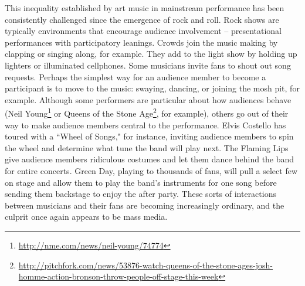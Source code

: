 This inequality established by art music in mainstream performance has been consistently challenged since the emergence of rock and roll. Rock shows are typically environments that encourage audience involvement -- presentational performances with participatory leanings. Crowds join the music making by clapping or singing along, for example. They add to the light show by holding up lighters or illuminated cellphones. Some musicians invite fans to shout out song requests. Perhaps the simplest way for an audience member to become a participant is to move to the music: swaying, dancing, or joining the mosh pit, for example. Although some performers are particular about how audiences behave (Neil Young\footnote{\url{http://nme.com/news/neil-young/74774}} or Queens of the Stone Age\footnote{\url{http://pitchfork.com/news/53876-watch-queens-of-the-stone-ages-josh-homme-action-bronson-throw-people-off-stage-this-week}}, for example), others go out of their way to make audience members central to the performance. Elvis Costello has toured with a ``Wheel of Songs," for instance, inviting audience members to spin the wheel and determine what tune the band will play next. The Flaming Lips give audience members ridiculous costumes and let them dance behind the band for entire concerts. Green Day, playing to thousands of fans, will pull a select few on stage and allow them to play the band's instruments for one song before sending them backstage to enjoy the after party. These sorts of interactions between musicians and their fans are becoming increasingly ordinary, and the culprit once again appears to be mass media.

